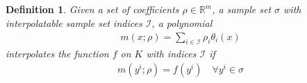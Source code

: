 \documentclass{article}
\newtheorem{definition}{Definition}[theorem]
\theoremstyle{case}
\newcommand{\Rm}{\mathbb R^m}
\newcommand{\bidx}{{\mathcal I}}
\begin{document}
\subsection{}





\subsection{}

\begin{definition}
Given a set of coefficients $\rho \in \Rm$, a sample set $\sigma$ with interpolatable sample set indices $\bidx$,
a polynomial
\begin{align*}
m(x; \rho) = \sum_{i\in \bidx} \rho_i \theta_i(x)
\end{align*}
interpolates the function $f$ on $K$ with indices $\bidx$ if
\begin{align*}
m(y^i; \rho) = f(y^i) \quad \forall y^i \in \sigma
\end{align*}
\end{definition}
\end{document}
